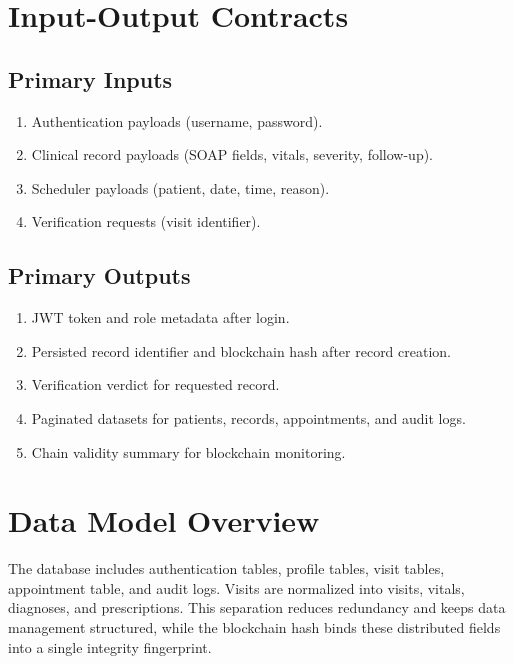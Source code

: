 \documentclass[12pt,a4paper]{report}
\begin{document}
\section{Input-Output Contracts}

\subsection*{Primary Inputs}

\begin{enumerate}
\item Authentication payloads (username, password).
\item Clinical record payloads (SOAP fields, vitals, severity, follow-up).
\item Scheduler payloads (patient, date, time, reason).
\item Verification requests (visit identifier).
\end{enumerate}

\subsection*{Primary Outputs}

\begin{enumerate}
\item JWT token and role metadata after login.
\item Persisted record identifier and blockchain hash after record creation.
\item Verification verdict for requested record.
\item Paginated datasets for patients, records, appointments, and audit logs.
\item Chain validity summary for blockchain monitoring.
\end{enumerate}

\section{Data Model Overview}

The database includes authentication tables, profile tables, visit tables, appointment table, and audit logs. Visits are normalized into visits, vitals, diagnoses, and prescriptions. This separation reduces redundancy and keeps data management structured, while the blockchain hash binds these distributed fields into a single integrity fingerprint.
\end{document}
